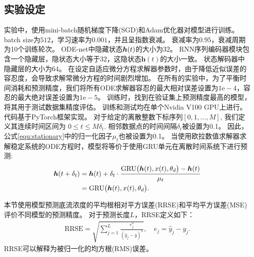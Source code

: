 \subsection{实验设定}

实验中，使用mini-batch随机梯度下降(SGD)和Adam优化器\cite{kingma2014adam}对模型进行训练。
batch size为$512$，学习速率为$0.001$，并且呈指数衰减。
衰减率为$0.95$，衰减周期为10个训练轮次。
ODE-net中隐藏状态$\boldsymbol h(t)$的大小为$32$。
RNN序列编码器模块包含一个隐藏层，隐状态大小等于$32$，这隐状态$\boldsymbol h(t)$的大小一致。
状态解码器中隐藏层的大小为$64$。
在设定自适应微分方程求解器参数时，由于降低近似误差的容忍度，会导致求解常微分方程的时间剧烈增加。
在所有的实验中，为了平衡时间消耗和预测精度，我们将所有ODE求解器容忍的最大相对误差设置为$1\mathrm{e}-4$，容忍的最大绝对误差设置为$1\mathrm{e}-5$。
训练时，找到在验证集上预测精度最高的模型，将其用于测试数据集精度评估。
训练和测试均在单个Nvidia V100 GPU上进行。
代码基于PyTorch框架实现。
对于给定的离散整数下标序列$[0,1,\dots, M]$, 我们定义其连续时间区间为 $0\leq t\leq M\delta_t$.
相邻数据点的时间间隔$\delta _t$被设置为0.1。
因此，公式\eqref{equ:stationary}中的归一化因子$\mu _t$也被设置为0.1。
当使用欧拉数值求解器求解稳定系统的ODE方程时，模型将等价于使用GRU单元在离散时间系统下进行预测:
\begin{align}
    \boldsymbol h(t+\delta _t) &=\boldsymbol h(t) + \delta _t \cdot \frac{\text{GRU}\big(\boldsymbol h(t),x(t), \theta_d \big) - \boldsymbol h(t)}{\mu _t}  \nonumber\\
                      &= \text{GRU}\big(\boldsymbol h(t),x(t), \theta _d\big).
\end{align}

本节使用模型预测底流浓度的平均根相对平方误差(RRSE)和平均平方误差(MSE)评价不同模型的预测精度。
对于预测长度$L$，RRSE定义如下：
\begin{equation}
\begin{aligned}
    \text{RRSE}=\sqrt{\sum_{j=1}^{L} \frac{e_{j}^{2}}{\left(\hat{y}_{j}-\bar{y}\right)^{2}}}, \quad e_{j}=\hat{y}_{j}-y_{j}.
\end{aligned}
\label{equ:rrse}
\end{equation}
RRSE可以解释为被归一化的均方根(RMS)误差。



